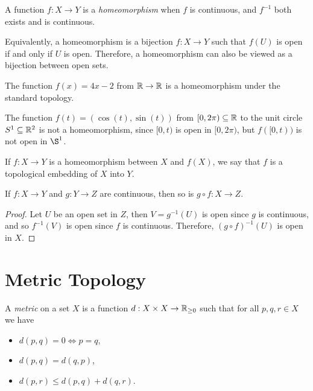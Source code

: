 \begin{defn}
    A function $f: X \to Y$ is a \emph{homeomorphism} when $f$ is continuous, and $f^{-1}$ both exists and is continuous.
\end{defn}

\begin{rmk}
    Equivalently, a homeomorphism is a bijection $f: X \to Y$ such that $f(U)$ is open if and only if $U$ is open. Therefore, a homeomorphism can also be viewed as a bijection between open sets.
\end{rmk}

\begin{exmp}
    The function $f(x) = 4x - 2$ from $\mathbb{R} \to \mathbb{R}$ is a homeomorphism under the standard topology.
\end{exmp}

\begin{exmp}
    The function $f(t) = (\cos(t), \sin(t))$ from $[0, 2\pi) \subseteq \mathbb{R}$ to the unit circle $S^1 \subseteq \mathbb{R}^2$ is not a homeomorphism, since $[0, t)$ is open in $[0, 2\pi)$, but $f([0, t))$ is not open in $\S^1$.
\end{exmp}

\begin{defn}
    If $f: X \to Y$ is a homeomorphism between $X$ and $f(X)$, we say that $f$ is a topological embedding of $X$ into $Y$.
\end{defn}

\begin{thm}
    If $f: X \to Y$ and $g: Y \to Z$ are continuous, then so is $g \circ f: X \to Z$.
\end{thm}

\begin{proof}
    Let $U$ be an open set in $Z$, then $V = g^{-1}(U)$ is open since $g$ is continuous, and so $f^{-1}(V)$ is open since $f$ is continuous. Therefore, $(g \circ f)^{-1}(U)$ is open in $X$.
\end{proof}

\section{Metric Topology}

\begin{defn}
    A \emph{metric} on a set $X$ is a function $d: X \times X \to \mathbb{R}_{\geq 0}$ such that for all $p, q, r \in X$ we have
    \begin{itemize}
        \item $d(p, q) = 0 \iff p = q$,
        \item $d(p, q) = d(q, p)$,
        \item $d(p, r) \leq d(p, q) + d(q, r)$.
    \end{itemize}
\end{defn}

